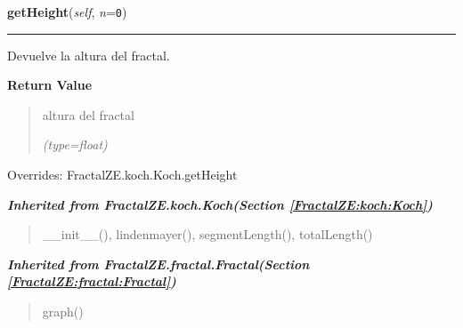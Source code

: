     \vspace{0.5ex}

\hspace{.8\funcindent}\begin{boxedminipage}{\funcwidth}

    \raggedright \textbf{getHeight}(\textit{self}, \textit{n}={\tt 0})

    \vspace{-1.5ex}

    \rule{\textwidth}{0.5\fboxrule}
\setlength{\parskip}{2ex}
    Devuelve la altura del fractal.

\setlength{\parskip}{1ex}
      \textbf{Return Value}
    \vspace{-1ex}

      \begin{quote}
      altura del fractal

      {\it (type=float)}

      \end{quote}

      Overrides: FractalZE.koch.Koch.getHeight

    \end{boxedminipage}


\large{\textbf{\textit{Inherited from FractalZE.koch.Koch\textit{(Section \ref{FractalZE:koch:Koch})}}}}

\begin{quote}
\_\_init\_\_(), lindenmayer(), segmentLength(), totalLength()
\end{quote}

\large{\textbf{\textit{Inherited from FractalZE.fractal.Fractal\textit{(Section \ref{FractalZE:fractal:Fractal})}}}}

\begin{quote}
graph()
\end{quote}
